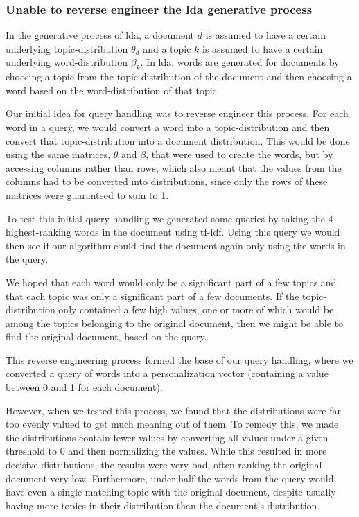 \subsubsection{Unable to reverse engineer the \gls{lda} generative process}
In the generative process of \gls{lda}, a document $d$ is assumed to have a certain underlying topic-distribution $\theta_d$ and a topic $k$ is assumed to have a certain underlying word-distribution $\beta_k$.
In \gls{lda}, words are generated for documents by choosing a topic from the topic-distribution of the document and then choosing a word based on the word-distribution of that topic.

Our initial idea for query handling was to reverse engineer this process.
For each word in a query, we would convert a word into a topic-distribution and then convert that topic-distribution into a document distribution.
This would be done using the same matrices, $\theta$ and $\beta$, that were used to create the words, but by accessing columns rather than rows, which also meant that the values from the columns had to be converted into distributions, since only the rows of these matrices were guaranteed to sum to 1.

To test this initial query handling we generated some queries by taking the 4 highest-ranking words in the document using \gls{tf-idf}. Using this query we would then see if our algorithm could find the document again only using the words in the query.

We hoped that each word would only be a significant part of a few topics and that each topic was only a significant part of a few documents.
If the topic-distribution only contained a few high values, one or more of which would be among the topics belonging to the original document, then we might be able to find the original document, based on the query.

This reverse engineering process formed the base of our query handling, where we converted a query of words into a personalization vector (containing a value between 0 and 1 for each document).

However, when we tested this process, we found that the distributions were far too evenly valued to get much meaning out of them.
To remedy this, we made the distributions contain fewer values by converting all values under a given threshold to 0 and then normalizing the values.
While this resulted in more decisive distributions, the results were very bad, often ranking the original document very low.
Furthermore, under half the words from the query would have even a single matching topic with the original document, despite usually having more topics in their distribution than the document's distribution.
 
